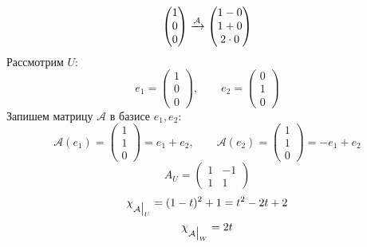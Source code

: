 \begin{eg}
$$\begin{pmatrix}
		1 \\
		0 \\
		0
	\end{pmatrix} \xrightarrow{\mathcal{A}}
	\begin{pmatrix}
		1 - 0 \\
		1 + 0 \\
		2 \cdot 0
	\end{pmatrix} $$
	Рассмотрим $ U $:
	$$ e_1 =
	\begin{pmatrix}
		1 \\
		0 \\
		0
	\end{pmatrix}, \qquad e_2 =
	\begin{pmatrix}
		0 \\
		1 \\
		0
	\end{pmatrix} $$
	Запишем матрицу $ \mathcal{A} $ в базисе $ e_1, e_2 $:
	$$ \mathcal{A}(e_1) =
	\begin{pmatrix}
		1 \\
		1 \\
		0
	\end{pmatrix} = e_1 + e_2, \qquad \mathcal{A}(e_2) =
	\begin{pmatrix}
		1 \\
		1 \\
		0
	\end{pmatrix} = -e_1 + e_2 $$
	$$ A_U =
	\begin{pmatrix}
		1 & -1 \\
		1 & 1
	\end{pmatrix} $$
	$$ \chi_{\mathcal{A}\big|_{U}^{}} = (1 - t)^2 + 1 = t^2 - 2t + 2 $$
	$$ \chi_{\mathcal{A}\big|_{W}^{}} = 2t $$
\end{eg}

